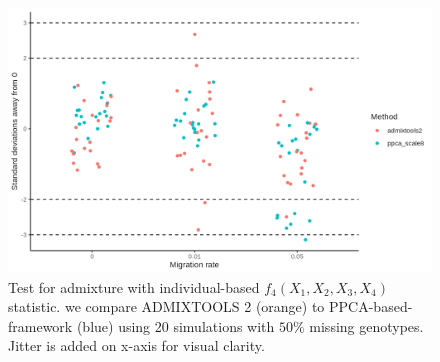 \documentclass[12pt]{article}
\begin{document}
\begin{figure}[ht!]
    \includegraphics[width=16.5cm]{Images/Figures/hypothesis_test_comparison.png}
    \centering
         \caption{Test for admixture with individual-based $f_4(X_1, X_2, X_3, X_4)$ statistic. we compare ADMIXTOOLS 2 (orange) to PPCA-based-framework (blue) using 20 simulations with $50\%$ missing genotypes. Jitter is added on x-axis for visual clarity.}
    \label{fig:admixture}
\end{figure}
\end{document}
